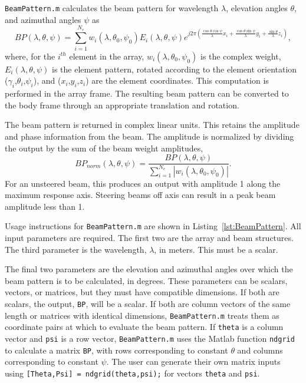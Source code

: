 \texttt{BeamPattern.m} calculates the beam pattern for wavelength $\lambda$, elevation angles $\theta$, and azimuthal angles $\psi$ as
\begin{equation}
BP(\lambda,\theta,\psi) = \sum_{i=1}^{N_e} w_i(\lambda,\theta_0,\psi_0)E_i(\lambda,\theta,\psi)e^{j2\pi\left(\frac{\cos\theta\cos\psi}{\lambda}x_i + \frac{\cos\theta\sin\psi}{\lambda}y_i + \frac{\sin\theta}{\lambda}z_i\right)},
\end{equation}
where, for the $i^{th}$ element in the array, $w_i(\lambda,\theta_0,\psi_0)$ is the complex weight, $E_i(\lambda,\theta,\psi)$ is the element pattern, rotated according to the element orientation ($\gamma_i$,$\theta_i$,$\psi_i$), and ($x_i$,$y_i$,$z_i$) are the element coordinates. This computation is performed in the array frame. The resulting beam pattern can be converted to the body frame through an appropriate translation and rotation.

The beam pattern is returned in complex linear units. This retains the amplitude and phase information from the beam. The amplitude is normalized by dividing the output by the sum of the beam weight amplitudes,
\begin{equation}
BP_{norm}(\lambda,\theta,\psi) = \frac{BP(\lambda,\theta,\psi)}{\sum_{i=1}^{N_e}|w_i(\lambda,\theta_0,\psi_0)|}.
\end{equation}
For an unsteered beam, this produces an output with amplitude 1 along the maximum response axis. Steering beams off axis can result in a peak beam amplitude less than 1.

Usage instructions for \texttt{BeamPattern.m} are shown in Listing~\ref{lst:BeamPattern}. All input parameters are required. The first two are the array and beam structures. The third parameter is the wavelength, $\lambda$, in meters. This must be a scalar. 

The final two parameters are the elevation and azimuthal angles over which the beam pattern is to be calculated, in degrees. These parameters can be scalars, vectors, or matrices, but they must have compatible dimensions. If both are scalars, the output, \texttt{BP}, will be a scalar. If both are column vectors of the same length or matrices with identical dimensions, \texttt{BeamPattern.m} treats them as coordinate pairs at which to evaluate the beam pattern. If \texttt{theta} is a column vector and \texttt{psi} is a row vector, \texttt{BeamPattern.m} uses the Matlab function \texttt{ndgrid} to calculate a matrix \texttt{BP}, with rows corresponding to constant $\theta$ and columns corresponding to constant $\psi$. The user can generate their own matrix inputs using \texttt{[Theta,Psi] = ndgrid(theta,psi);} for vectors \texttt{theta} and \texttt{psi}.

